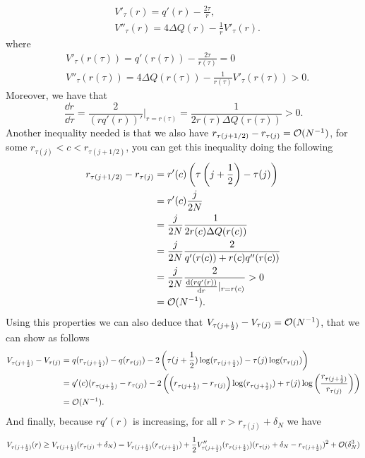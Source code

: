 \begin{align}
 & V'_\tau(r) = q'(r) - \frac{2\tau}{r}, \\
 & V''_\tau(r) = 4 \Delta Q(r) - \frac{1}{r} V'_\tau(r).
\end{align}
where
\begin{align}
	& V'_\tau(r(\tau)) = q'(r(\tau)) - \frac{2\tau}{r(\tau)} = 0 \\
	& V''_\tau(r(\tau)) = 4 \Delta Q(r(\tau)) - \frac{1}{r(\tau)} V'_\tau(r(\tau)) > 0.
\end{align}
Moreover, we have that
\begin{equation}
	\frac{\dd r}{\dd \tau} = \frac{2}{(r q'(r))'} |_{r = r(\tau)} = \frac{1}{2 r(\tau) \Delta Q (r(\tau))} > 0.
\end{equation}
 Another inequality needed is that we also have $r_{\tau(j+1/2)} - r_{\tau(j)} = \mathcal{O}(N^{-1})$, for some $r_{\tau(j)}< c <r_{\tau(j+1/2)}$, you can get this inequality doing the following
\begin{align}
	r_{\tau(j+1/2)} - r_{\tau(j)} & = r'(c) \left( \tau\left(j+\frac{1}{2}\right) - \tau(j)\right)	\\
	& = r'(c) \frac{j}{2N} \\
	& = \frac{j}{2N} \frac{1}{2 r(c) \Delta Q (r(c))} \\
	&  = \frac{j}{2N} \frac{2}{q'(r(c)) + r(c) q''(r(c))} \\
	& = \frac{j}{2N} \frac{2}{\frac{\mathrm{d} (r q'(r))}{\mathrm{d} r}|_{r = r(c)}} > 0 \\
	& = \mathcal{O}(N^{-1}).
\end{align}
Using this properties we can also deduce that $V_{\tau(j+\frac{1}{2})} - V_{\tau(j)} = \mathcal{O}(N^{-1})$, that we can show as follows
\begin{align}
	V_{\tau(j+\frac{1}{2})} - V_{\tau(j)} &= q(r_{\tau(j+\frac{1}{2})}) - q(r_{\tau(j)}) - 2 \left( \tau(j+\frac{1}{2}) \log(r_{\tau(j+\frac{1}{2})}) - \tau(j) \log(r_{\tau(j)}) \right) \\
	& = q'(c) (r_{\tau(j+\frac{1}{2})} - r_{\tau(j)}) - 2 \left( \left(r_{\tau(j+\frac{1}{2})} - r_{\tau(j)} \right) \log(r_{\tau(j+\frac{1}{2})}) + \tau(j) \log\left( \frac{r_{\tau(j+\frac{1}{2})}}{r_{\tau(j)}}  \right) \right) \\
	& = \mathcal{O}(N^{-1}).
\end{align}
And finally, because $r q'(r)$ is increasing, for all $r > r_{\tau(j)} + \delta_N$ we have
\begin{equation}
	V_{\tau(j+\frac{1}{2})}(r) \geq V_{\tau(j+\frac{1}{2})}(r_{\tau(j)} + \delta_N) =  V_{\tau(j+\frac{1}{2})}(r_{\tau(j+\frac{1}{2})}) + \frac{1}{2} V''_{\tau(j+\frac{1}{2})}(r_{\tau(j+\frac{1}{2})}) (r_{\tau(j)} + \delta_N - r_{\tau(j+\frac{1}{2})})^2 + \mathcal{O}(\delta_N^3) 
\end{equation} 
